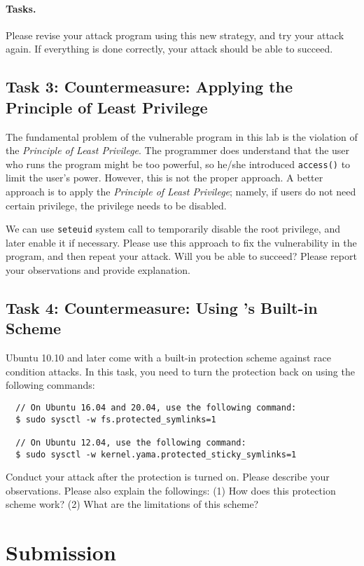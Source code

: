 \paragraph{Tasks.} Please revise your attack program using 
this new strategy, and try your attack again. If everything 
is done correctly, your attack should be able to succeed. 



\subsection{Task 3: Countermeasure: Applying the Principle of Least Privilege}

The fundamental problem of the vulnerable program in this lab is 
the violation of the {\em Principle of Least Privilege}. 
The programmer does understand that the user who runs the program 
might be too powerful, so he/she introduced {\tt access()} to limit the user's 
power. However, this is not the proper approach. A better
approach is to apply the {\em Principle of Least Privilege}; 
namely, if users do not need certain privilege, the privilege
needs to be disabled.

We can use {\tt seteuid{}} system call to temporarily disable
the root privilege, and later enable it if necessary. Please use 
this approach to fix the vulnerability in the program, and then
repeat your attack. Will you be able to succeed? Please report your
observations and provide explanation.



\subsection{Task 4: Countermeasure: Using \ubuntu's Built-in Scheme}

Ubuntu 10.10 and later come with a built-in protection scheme against race condition
attacks. In this task, you need to turn the protection back on using the
following commands:

\begin{lstlisting}
  // On Ubuntu 16.04 and 20.04, use the following command:
  $ sudo sysctl -w fs.protected_symlinks=1

  // On Ubuntu 12.04, use the following command:
  $ sudo sysctl -w kernel.yama.protected_sticky_symlinks=1
\end{lstlisting}

Conduct your attack after the protection is turned on.  
Please describe your observations. Please also explain
the followings: (1) How does this protection scheme work?
(2) What are the limitations of this scheme?






\section{Submission}

\seedsubmission



